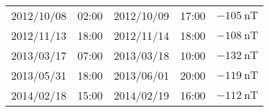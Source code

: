 \begin{table}[ht]
\begin{tabular}{ccccc}
	2012/10/08 & 02:00 & 2012/10/09 & 17:00 & $ \SI{-105}{\nano\tesla}$ \\
	2012/11/13 & 18:00 & 2012/11/14 & 18:00 & $ \SI{-108}{\nano\tesla}$ \\
	2013/03/17 & 07:00 & 2013/03/18 & 10:00 & $ \SI{-132}{\nano\tesla}$ \\
	2013/05/31 & 18:00 & 2013/06/01 & 20:00 & $ \SI{-119}{\nano\tesla}$ \\
	2014/02/18 & 15:00 & 2014/02/19 & 16:00 & $ \SI{-112}{\nano\tesla}$ \\ \hline
	\end{tabular}%
	\end{table}

	


%
%